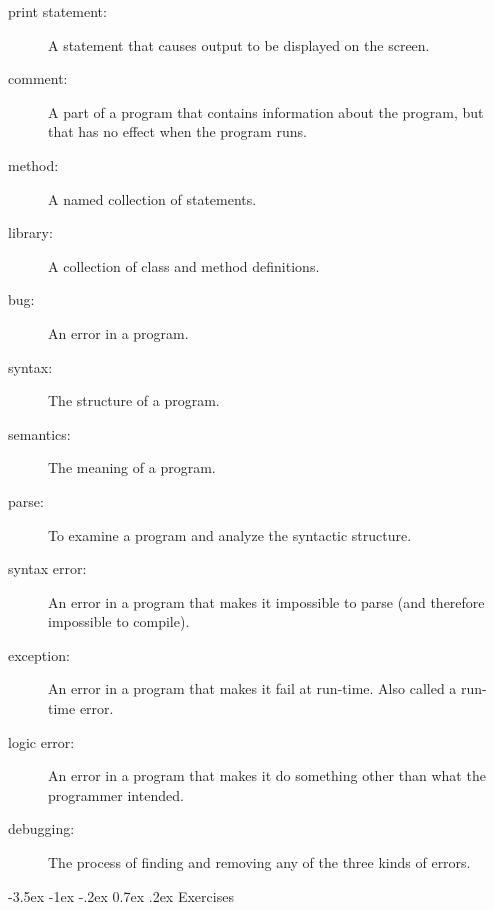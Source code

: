 \documentclass{book}
\makeatletter
\renewcommand{\section}{\@startsection 
    {section} {1} {0mm}%
    {-3.5ex \@plus -1ex \@minus -.2ex}%
    {0.7ex \@plus.2ex}%
    {\normalfont\Large\bfseries}}
\makeatother
\begin{document}
\begin{description}
\item[print statement:] A statement that causes output to be displayed
  on the screen.

\item[comment:] A part of a program that contains information
about the program, but that has no effect when the program runs.

\item[method:] A named collection of statements.

\item[library:] A collection of class and method definitions.

\item[bug:]  An error in a program.

\item[syntax:]  The structure of a program.

\item[semantics:]  The meaning of a program.

\item[parse:]  To examine a program and analyze the syntactic structure.

\item[syntax error:]  An error in a program that makes it impossible
to parse (and therefore impossible to compile).

\item[exception:]  An error in a program that makes it fail at
run-time.  Also called a run-time error.

\item[logic error:]  An error in a program that makes it do something
other than what the programmer intended.

\item[debugging:]  The process of finding and removing any of
the three kinds of errors.


\end{description}

\section{Exercises}
\end{document}
